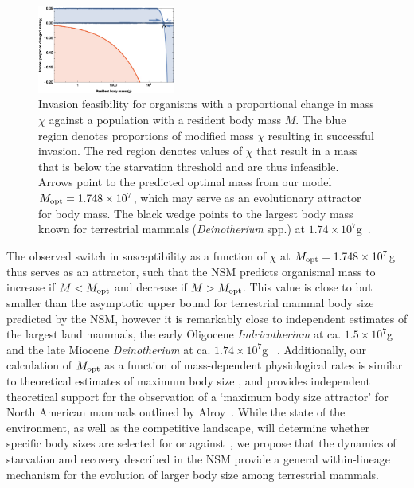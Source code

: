\documentclass{pnastwo}
\begin{document}
\begin{article}
\begin{figure}
\centering
\includegraphics[width=0.4\textwidth]{fig_Invasion.eps}
\caption{\small{ Invasion feasibility for organisms with a proportional change in
  mass $\chi$ against a population with a resident body mass $M$.  The blue
  region denotes proportions of modified mass $\chi$ resulting in successful invasion.  The
  red region denotes values of $\chi$ that result in a mass that is below the
  starvation threshold and are thus infeasible.
  Arrows point to the predicted optimal mass from our model $M_{\rm opt}=1.748\times 10^7$, which may serve as an evolutionary attractor for body mass.
  The black wedge points to the largest body mass known for terrestrial mammals (\emph{Deinotherium} spp.) at $1.74\times10^7$g~\cite{Smith:2010p3442}.}}
\label{fig:invasion}
\end{figure}

The observed switch in susceptibility as a function of $\chi$ at $M_{\rm opt}= 1.748\times10^7$g thus serves as an attractor, such that the NSM predicts organismal mass to increase if $M<M_{\rm opt}$ and decrease if $M>M_{\rm opt}$.
This value is close to but smaller than the asymptotic upper bound for terrestrial mammal body size predicted by the NSM, however it is remarkably close to independent estimates of the largest land mammals, the early Oligocene \emph{Indricotherium} at ca. $1.5\times10^7$g and the late Miocene \emph{Deinotherium} at ca. $1.74\times10^7$g ~\cite{Smith:2010p3442}.
Additionally, our calculation of $M_{\rm opt}$ as a function of mass-dependent physiological rates is similar to theoretical estimates of maximum body size \cite{Clauset:2009fh}, and provides independent theoretical support for the observation of a `maximum body size attractor' for North American mammals outlined by Alroy~\cite{Alroy:1998p1594}.
While the state of the environment, as well as the competitive landscape, will determine whether specific body sizes are selected for or against~\cite{Saarinen:2014br}, we propose that the dynamics of starvation and recovery described in the NSM provide a general within-lineage mechanism for the evolution of larger body size among terrestrial mammals.



\end{article}
\end{document}
